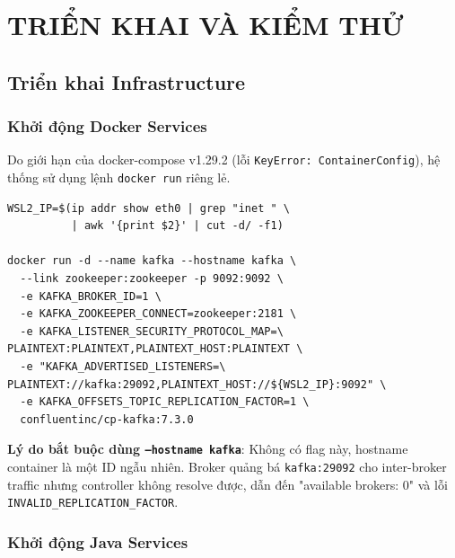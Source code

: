 \documentclass[12pt,a4paper]{report}
\begin{document}
\chapter{TRIỂN KHAI VÀ KIỂM THỬ}

\section{Triển khai Infrastructure}

\subsection{Khởi động Docker Services}

Do giới hạn của docker-compose v1.29.2 (lỗi \texttt{KeyError: ContainerConfig}), hệ thống sử dụng lệnh \texttt{docker run} riêng lẻ.

\begin{lstlisting}[style=bashStyle, caption={Khởi động Kafka với --hostname bắt buộc}, label={lst:kafka}]
WSL2_IP=$(ip addr show eth0 | grep "inet " \
          | awk '{print $2}' | cut -d/ -f1)

docker run -d --name kafka --hostname kafka \
  --link zookeeper:zookeeper -p 9092:9092 \
  -e KAFKA_BROKER_ID=1 \
  -e KAFKA_ZOOKEEPER_CONNECT=zookeeper:2181 \
  -e KAFKA_LISTENER_SECURITY_PROTOCOL_MAP=\
PLAINTEXT:PLAINTEXT,PLAINTEXT_HOST:PLAINTEXT \
  -e "KAFKA_ADVERTISED_LISTENERS=\
PLAINTEXT://kafka:29092,PLAINTEXT_HOST://${WSL2_IP}:9092" \
  -e KAFKA_OFFSETS_TOPIC_REPLICATION_FACTOR=1 \
  confluentinc/cp-kafka:7.3.0
\end{lstlisting}

\textbf{Lý do bắt buộc dùng \texttt{--hostname kafka}}: Không có flag này, hostname container là một ID ngẫu nhiên. Broker quảng bá \texttt{kafka:29092} cho inter-broker traffic nhưng controller không resolve được, dẫn đến "available brokers: 0" và lỗi \texttt{INVALID\_REPLICATION\_FACTOR}.

\subsection{Khởi động Java Services}
\end{document}
